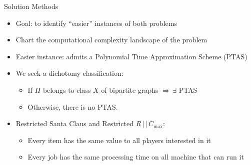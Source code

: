 \begin{frame}[t]{Solution Methods}
    \begin{itemize}
        \item<1-> Goal: to identify ``easier'' instances of both problems
        \item<2-> Chart the computational complexity landscape of the  problem
        \item<3-> Easier instance: admits a Polynomial Time Approximation Scheme (PTAS)
        \item<4-> We seek a dichotomy classification: 
            \begin{itemize}
                \item<5->If $H$ belongs to class $X$ of bipartite graphs $\Rightarrow \, \exists$ PTAS
                \item<6-> Otherwise, there is no PTAS.
            \end{itemize}
        \item<7-> Restricted Santa Claus and Restricted $R \, | \, | \, C_{\max}$:
            \begin{itemize}
                \item<8-> Every item has the same value to all players interested in it
                \item<9-> Every job has the same processing time on all machine that can run it
            \end{itemize}
    \end{itemize}
\end{frame}

